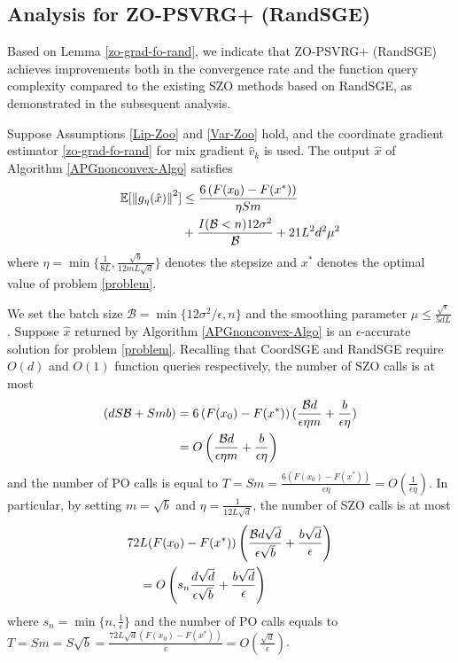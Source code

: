 \subsection{Analysis for ZO-PSVRG+ (RandSGE)}
Based on Lemma \ref{zo-grad-fo-rand}, we indicate that ZO-PSVRG+ (RandSGE) achieves improvements both in the convergence rate and the function query complexity compared to the existing SZO methods based on RandSGE, as demonstrated in the subsequent analysis.
\begin{theorem}\label{noncon-zoo-rand}
Suppose Assumptions \ref{Lip-Zoo} and \ref{Var-Zoo} hold, and the coordinate gradient estimator \eqref{zo-grad-fo-rand} for mix gradient $\hat{v}_k$ is used. The output $\hat{x}$ of Algorithm \ref{APGnonconvex-Algo} satisfies
  \begin{align}
\mathbb{E}[\left\lVert g_{\eta}(\hat{x})\right\rVert^2] & \leq \frac{6\left(F(x_0) - F({x}^*)\right)}{\eta Sm}\notag\\
&  + \frac{I(\mathcal{B} < n)12\sigma ^2}{\mathcal{B}}+21{L^2 d^2 \mu^2}\label{eq-noncon-zoo-rand}
 \end{align}
where $\eta = \min\{\frac{1}{8L}, \frac{\sqrt{b}}{12mL\sqrt{d}}\}$ denotes the stepsize and $x^*$ denotes the optimal value of problem \ref{problem}.
\end{theorem}
\begin{corollary}\label{corr11-rand}
We set the batch size $\mathcal{B} = \min\{12\sigma^2/\epsilon, n\}$ and the smoothing parameter $\mu \leq \frac{\sqrt{\epsilon}}{5{dL}}$. Suppose $\hat{x}$ returned by Algorithm \ref{APGnonconvex-Algo}  is an $\epsilon$-accurate solution for problem \eqref{problem}. Recalling that CoordSGE and RandSGE require $O(d)$ and $O(1)$ function queries respectively, the number of SZO calls is at most 
\begin{align}
(dS\mathcal{B}+Smb) & = 6 \left(F(x_0) - F({x}^*)\right) (\frac{\mathcal{B}d}{\epsilon\eta m}+\frac{b}{\epsilon\eta})\notag\\
& = O\left(\frac{\mathcal{B}d}{\epsilon\eta m}+\frac{b}{\epsilon\eta}\right)\label{SZO-call-nocon-rand}
\end{align} 
and the number of PO calls is equal to $T = Sm = \frac{6\left(F(x_0) - F({x}^*)\right)}{\epsilon\eta} = O\left(\frac{1}{\epsilon\eta}\right)$. In particular, by setting $m=\sqrt{b}$ and $\eta = \frac{1}{12L\sqrt{d}}$, the number of SZO calls is at most 
\begin{align}
72 &L (F(x_0)-F(x^*))\left(\frac{\mathcal{B}d\sqrt{d}}{\epsilon\sqrt{b}}+\frac{b\sqrt{d}}{\epsilon}\right)\notag\\
& = O\left(s_n\frac{d\sqrt{d}}{\epsilon \sqrt{b}}+\frac{b\sqrt{d}}{\epsilon}\right)\label{SZO-call-par-nocon-rand}
\end{align}
where $s_n = \min\{n,\frac{1}{\epsilon}\}$ and the number of PO calls equals to $T = Sm = S\sqrt{b} = \frac{72 L \sqrt{d}\left(F(x_0) - F({x}^*)\right)}{\epsilon} = O\left(\frac{\sqrt{d}}{\epsilon}\right)$. 
\end{corollary}
